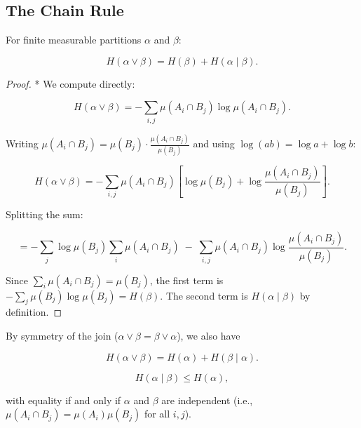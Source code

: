 \subsection{The Chain Rule}\label{sec:11.3.2}

\begin{theorem}\label{thm:11.9}
For finite measurable partitions $\alpha$ and $\beta$:

\[
H(\alpha \vee \beta) = H(\beta) + H(\alpha \mid \beta).
\]
\end{theorem}


\begin{proof}
* We compute directly:

\[
H(\alpha \vee \beta) = -\sum_{i,j} \mu(A_i \cap B_j) \log \mu(A_i \cap B_j).
\]

Writing $\mu(A_i \cap B_j) = \mu(B_j) \cdot \frac{\mu(A_i \cap B_j)}{\mu(B_j)}$ and using $\log(ab) = \log a + \log b$:

\[
H(\alpha \vee \beta) = -\sum_{i,j} \mu(A_i \cap B_j) \left[\log \mu(B_j) + \log \frac{\mu(A_i \cap B_j)}{\mu(B_j)}\right].
\]

Splitting the sum:

\[
= -\sum_{j} \log \mu(B_j) \sum_{i} \mu(A_i \cap B_j) \;-\; \sum_{i,j} \mu(A_i \cap B_j) \log \frac{\mu(A_i \cap B_j)}{\mu(B_j)}.
\]

Since $\sum_i \mu(A_i \cap B_j) = \mu(B_j)$, the first term is $-\sum_j \mu(B_j) \log \mu(B_j) = H(\beta)$. The second term is $H(\alpha \mid \beta)$ by definition.
\end{proof}


By symmetry of the join ($\alpha \vee \beta = \beta \vee \alpha$), we also have

\[
H(\alpha \vee \beta) = H(\alpha) + H(\beta \mid \alpha).
\]

\begin{corollary}\label{cor:11.10}

\[
H(\alpha \mid \beta) \leq H(\alpha),
\]

with equality if and only if $\alpha$ and $\beta$ are independent (i.e., $\mu(A_i \cap B_j) = \mu(A_i)\mu(B_j)$ for all $i, j$).
\end{corollary}


